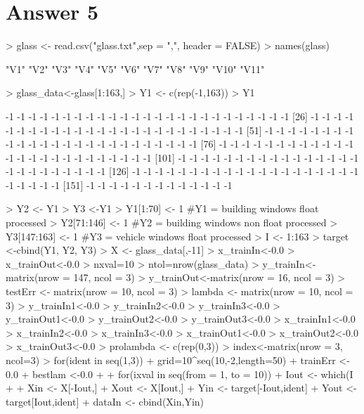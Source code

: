 \documentclass{article}
\begin{document}
\section*{Answer 5}
\begin{Schunk}
\begin{Sinput}
> glass <- read.csv("glass.txt",sep = ",", header = FALSE)
> names(glass)
\end{Sinput}
\begin{Soutput}
 [1] "V1"  "V2"  "V3"  "V4"  "V5"  "V6"  "V7"  "V8"  "V9"  "V10" "V11"
\end{Soutput}
\begin{Sinput}
> glass_data<-glass[1:163,]
> Y1 <- c(rep(-1,163))
> Y1
\end{Sinput}
\begin{Soutput}
  [1] -1 -1 -1 -1 -1 -1 -1 -1 -1 -1 -1 -1 -1 -1 -1 -1 -1 -1 -1 -1 -1 -1 -1 -1 -1
 [26] -1 -1 -1 -1 -1 -1 -1 -1 -1 -1 -1 -1 -1 -1 -1 -1 -1 -1 -1 -1 -1 -1 -1 -1 -1
 [51] -1 -1 -1 -1 -1 -1 -1 -1 -1 -1 -1 -1 -1 -1 -1 -1 -1 -1 -1 -1 -1 -1 -1 -1 -1
 [76] -1 -1 -1 -1 -1 -1 -1 -1 -1 -1 -1 -1 -1 -1 -1 -1 -1 -1 -1 -1 -1 -1 -1 -1 -1
[101] -1 -1 -1 -1 -1 -1 -1 -1 -1 -1 -1 -1 -1 -1 -1 -1 -1 -1 -1 -1 -1 -1 -1 -1 -1
[126] -1 -1 -1 -1 -1 -1 -1 -1 -1 -1 -1 -1 -1 -1 -1 -1 -1 -1 -1 -1 -1 -1 -1 -1 -1
[151] -1 -1 -1 -1 -1 -1 -1 -1 -1 -1 -1 -1 -1
\end{Soutput}
\begin{Sinput}
> Y2 <- Y1
> Y3 <-Y1
> Y1[1:70] <- 1        #Y1 = building windows float processed
> Y2[71:146] <- 1      #Y2 = building windows non float processed
> Y3[147:163] <- 1     #Y3 = vehicle windows float processed
> I <- 1:163
> target <-cbind(Y1, Y2, Y3)
> X <- glass_data[,-11]
> x_trainIn<-0.0
> x_trainOut<-0.0
> nxval=10 
> ntol=nrow(glass_data) 
> y_trainIn<-matrix(nrow = 147, ncol = 3)
> y_trainOut<-matrix(nrow = 16, ncol = 3)
> testErr <- matrix(nrow = 10, ncol = 3)
> lambda <- matrix(nrow = 10, ncol = 3)
> y_trainIn1<-0.0
> y_trainIn2<-0.0
> y_trainIn3<-0.0
> y_trainOut1<-0.0
> y_trainOut2<-0.0
> y_trainOut3<-0.0
> x_trainIn1<-0.0
> x_trainIn2<-0.0
> x_trainIn3<-0.0
> x_trainOut1<-0.0
> x_trainOut2<-0.0
> x_trainOut3<-0.0
> prolambda <- c(rep(0,3)) 
> index<-matrix(nrow = 3, ncol=3)
> for(ident in seq(1,3)){  
+     grid=10^seq(10,-2,length=50)
+     trainErr <- 0.0
+     bestlam <-0.0
+     
+     for(ixval in seq(from = 1, to = 10)){
+         Iout <- which(I%%10== ixval - 1)
+         
+         Xin <- X[-Iout,]
+         Xout <- X[Iout,]
+         Yin <- target[-Iout,ident]  
+         Yout <- target[Iout,ident]  
+         dataIn <- cbind(Xin,Yin)
}}
\end{Sinput}
\end{Schunk}
\end{document}
